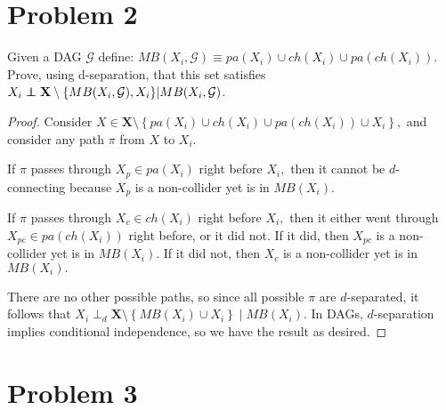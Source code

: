 \documentclass[letterpaper]{article}
\def\independenT#1#2{\mathrel{\rlap{$#1#2$}\mkern2mu{#1#2}}}
\newcommand\indep{\protect\mathpalette{\protect\independenT}{\perp}}
\def\independenT#1#2{\mathrel{\rlap{$#1#2$}\mkern2mu{#1#2}}}
\begin{document}
\newpage
\section*{Problem 2}

Given a DAG $\mathcal{G}$ define: $MB(X_i,\mathcal{G}) \equiv pa(X_i) \cup ch(X_i) \cup pa(ch(X_i))$. Prove, using d-separation, that this set satisfies $X_i \indep \mathbf{X} \setminus \{MB(X_i,\mathcal{G}), X_i\} | MB(X_i, \mathcal{G})$.
\begin{proof}
  Consider $X\in \mathbf{X}\setminus \left\{ pa(X_i)\cup ch(X_i)\cup pa(ch(X_i))\cup X_i \right\},$ and consider any path $\pi$ from $X$ to $X_i.$

  If $\pi$ passes through $X_p\in pa(X_i)$ right before $X_i,$ then it cannot be $d$-connecting because $X_p$ is a non-collider yet is in $MB(X_i).$

  If $\pi$ passes through $X_c\in ch(X_i)$ right before $X_i,$ then it either went through $X_{pc}\in pa(ch(X_i))$ right before, or it did not. If it did, then $X_{pc}$ is a non-collider yet is in $MB(X_i).$ If it did not, then $X_c$ is a non-collider yet is in $MB(X_i).$

  There are no other possible paths, so since all possible $\pi$ are $d$-separated, it follows that $X_i\perp_d \mathbf{X}\setminus\left\{ MB(X_i)\cup X_i \right\}\mid MB(X_i).$ In DAGs, $d$-separation implies conditional independence, so we have the result as desired.
\end{proof}


\newpage
\section*{Problem 3}
\end{document}
